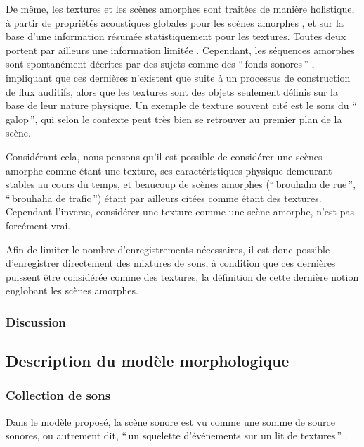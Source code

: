 De même, les textures et les scènes amorphes sont traitées de manière holistique, à partir de propriétés acoustiques globales pour les scènes amorphes \citep{dubois2006cognitive,maffiolo_caracterisation_1999}, et sur la base d'une information résumée statistiquement pour les textures\citep{mcdermott2013summary}. Toutes deux portent par ailleurs une information limitée \citep{saint1995classification,nelken2013ear}. Cependant, les séquences amorphes sont spontanément décrites par des sujets comme des ``\,fonds sonores\,'' \citep{maffiolo_caracterisation_1999,guastavino2006ideal}, impliquant que ces dernières n'existent que suite à un processus de construction de flux auditifs, alors que les textures sont des objets seulement définis sur la base de leur nature physique. Un exemple de texture souvent cité est le sons du ``\,galop\,'', qui selon le contexte peut très bien se retrouver au premier plan de la scène. 

Considérant cela, nous pensons qu'il est possible de considérer une scènes amorphe comme étant une texture, ses caractéristiques physique demeurant stables au cours du temps, et beaucoup de scènes amorphes (``\,brouhaha de rue\,'', ``\,brouhaha de trafic\,'') étant par ailleurs citées comme étant des textures. Cependant l'inverse, considérer une texture comme une scène amorphe, n'est pas forcément vrai.

Afin de limiter le nombre d'enregistrements nécessaires, il est donc possible d'enregistrer directement des mixtures de sons, à condition que ces dernières puissent être considérée comme des textures, la définition de cette dernière notion englobant les scènes amorphes.

\subsubsection{Discussion}

\subsection{Description du modèle morphologique}
\label{sec:ch4_modelDes}

\subsubsection{Collection de sons}
\label{sec:ch4_collecSons}

Dans le modèle proposé, la scène sonore est vu comme une somme de source sonores, ou autrement dit, ``\,un squelette d'événements sur un lit de textures\,'' \citep{nelken2013ear}. 

